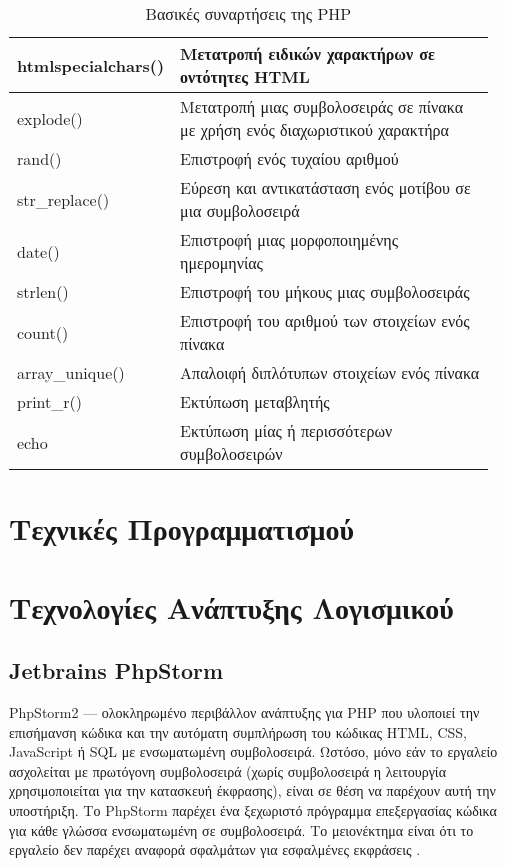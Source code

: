 \begin{table}[h]
	\caption{Βασικές συναρτήσεις της PHP}
	\label{tbl:php_basic_functions}
	\begin{tabular}{|p{0.2\linewidth}|p{0.75\linewidth}|}
		\hline
		htmlspecialchars() & Μετατροπή ειδικών χαρακτήρων σε οντότητες HTML \\ \hline
		explode() & Μετατροπή μιας συμβολοσειράς σε πίνακα με χρήση ενός διαχωριστικού χαρακτήρα \\ \hline
		rand() & Επιστροφή ενός τυχαίου αριθμού \\ \hline
		str\_replace() & Εύρεση και αντικατάσταση ενός μοτίβου σε μια συμβολοσειρά \\ \hline
		date() & Επιστροφή μιας μορφοποιημένης ημερομηνίας \\ \hline
		strlen() & Επιστροφή του μήκους μιας συμβολοσειράς \\ \hline
		count() & Επιστροφή του αριθμού των στοιχείων ενός πίνακα \\ \hline
		array\_unique() & Απαλοιφή διπλότυπων στοιχείων ενός πίνακα \\ \hline
		print\_r() & Εκτύπωση μεταβλητής \\ \hline
		echo & Εκτύπωση μίας ή περισσότερων συμβολοσειρών \\ \hline
	\end{tabular}
\end{table}

\section{Τεχνικές Προγραμματισμού}

\section{Τεχνολογίες Ανάπτυξης Λογισμικού}

\subsection{Jetbrains PhpStorm}
PhpStorm2 — ολοκληρωμένο περιβάλλον ανάπτυξης για PHP που υλοποιεί την επισήμανση κώδικα και την αυτόματη συμπλήρωση του κώδικας HTML, CSS, JavaScript ή SQL με ενσωματωμένη συμβολοσειρά. Ωστόσο, μόνο εάν το εργαλείο ασχολείται με πρωτόγονη συμβολοσειρά (χωρίς συμβολοσειρά η λειτουργία χρησιμοποιείται για την κατασκευή έκφρασης), είναι σε θέση να παρέχουν αυτή την υποστήριξη. Το PhpStorm παρέχει ένα ξεχωριστό πρόγραμμα επεξεργασίας κώδικα για κάθε γλώσσα ενσωματωμένη σε συμβολοσειρά. Το μειονέκτημα είναι ότι το εργαλείο δεν παρέχει αναφορά σφαλμάτων για εσφαλμένες εκφράσεις \cite{grigorev2014string}.


